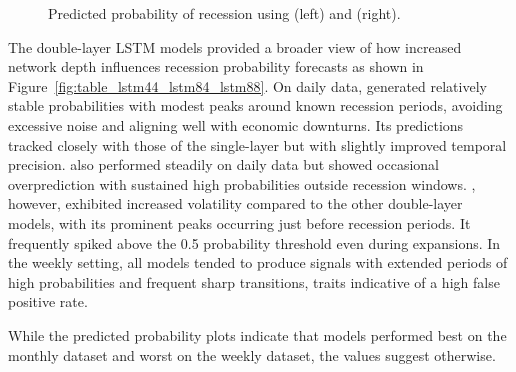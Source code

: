 \begin{figure}[H]
\begin{tabular}{c c}
    \end{tabular}
    \caption{Predicted probability of recession %
    using \LSTMF (left) and \LSTME (right).}
    \label{fig:table_lstm4_lstm8}
\end{figure}

\vspace{-21pt}

The double-layer LSTM models provided a broader view of how increased network depth influences recession probability forecasts as shown in Figure~\ref{fig:table_lstm44_lstm84_lstm88}.
On daily data, \LSTMFF generated relatively stable probabilities with modest peaks around known recession periods, avoiding excessive noise and aligning well with economic downturns. Its predictions tracked closely with those of the single-layer \LSTMF but with slightly improved temporal precision. \LSTMEF also performed steadily on daily data but showed occasional overprediction with sustained high probabilities outside recession windows. \LSTMEE, however, exhibited increased volatility compared to the other double-layer models, with its prominent peaks occurring just before recession periods. It frequently spiked above the 0.5 probability threshold even during expansions.
In the weekly setting, all models tended to produce signals with extended periods of high probabilities and frequent sharp transitions, traits indicative of a high false positive rate. 
 
While the predicted probability plots indicate that models performed best on the monthly dataset and worst on the weekly dataset, the \AUCone values suggest otherwise.




